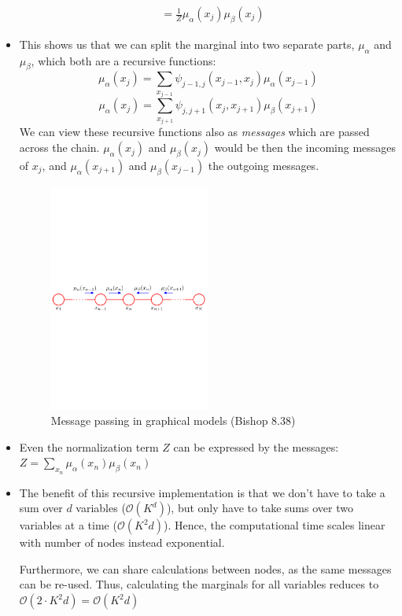 \begin{itemize}
\begin{equation*}
\begin{split}
		& = \frac{1}{Z}\mu_{\alpha}(x_j)\mu_{\beta}(x_j)
		\end{split}
	\end{equation*}
	\item This shows us that we can split the marginal into two separate parts, $\mu_{\alpha}$ and $\mu_{\beta}$, which both are a recursive functions:
	$$\mu_{\alpha}(x_j) = \sum_{x_{j-1}} \psi_{j-1,j}(x_{j-1},x_j) \mu_{\alpha}(x_{j-1})$$ 
	$$\mu_{\alpha}(x_j) = \sum_{x_{j+1}}\psi_{j,j+1}(x_{j},x_{j+1}) \mu_{\beta}(x_{j+1})$$ 
	We can view these recursive functions also as \textit{messages} which are passed across the chain. $\mu_{\alpha}(x_{j})$ and $\mu_{\beta}(x_{j})$ would be then the incoming messages of $x_j$, and $\mu_{\alpha}(x_{j+1})$ and $\mu_{\beta}(x_{j-1})$ the outgoing messages.
	\begin{figure}[ht!]
		\centering
		\includegraphics[width=0.5\textwidth]{figures/graphical_models_sum_product_message_passing.pdf}
		\caption{Message passing in graphical models (Bishop 8.38)}
	\end{figure}
	\item Even the normalization term $Z$ can be expressed by the messages: $Z=\sum_{x_n}\mu_{\alpha}(x_n)\mu_{\beta}(x_n)$
	\item The benefit of this recursive implementation is that we don't have to take a sum over $d$ variables ($\mathcal{O}(K^{d})$), but only have to take sums over two variables at a time ($\mathcal{O}(K^{2}d)$). Hence, the computational time scales linear with number of nodes instead exponential.
	
	Furthermore, we can share calculations between nodes, as the same messages can be re-used. Thus, calculating the marginals for all variables reduces to $\mathcal{O}(2\cdot K^2{d})=\mathcal{O}(K^2{d})$
\end{itemize}
